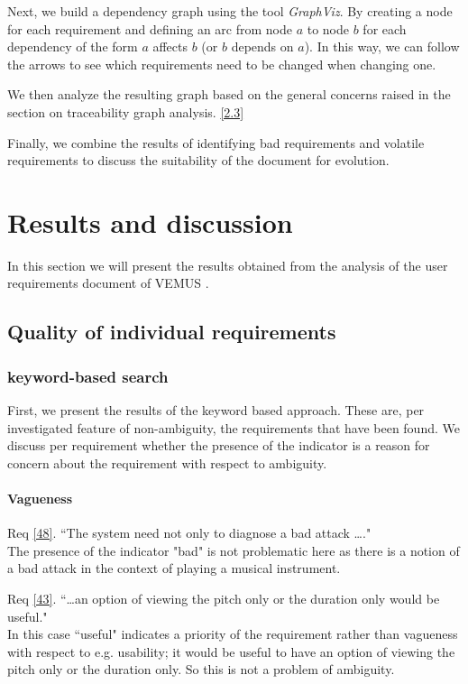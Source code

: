 \documentclass[a4paper,twoside, twocolumn,11pt]{article}
\numberwithin{equation}{section}
\begin{document}
Next, we build a dependency graph using the tool \textit{GraphViz}. By creating a node for each requirement and defining an arc from node $a$ to node $b$ for each dependency of the form $a$ affects $b$ (or $b$ depends on $a$). In this way, we can follow the arrows to see which requirements need to be changed when changing one. 

We then analyze the resulting graph based on the general concerns raised in the section on traceability graph analysis. \ref{2.3}

Finally, we combine the results of identifying bad requirements and volatile requirements to discuss the suitability of the document for evolution. 


\section{Results and discussion}
In this section we will present the results obtained from the analysis of the user requirements document of VEMUS \cite{VEMUS}.

\subsection{Quality of individual requirements}
\subsubsection{keyword-based search}
First, we present the results of the keyword based approach. These are, per investigated feature of non-ambiguity, the requirements that have been found. We discuss per requirement whether the presence of the indicator is a reason for concern about the requirement with respect to ambiguity.
\paragraph{Vagueness} 
Req \ref{48}. ``The system need not only to diagnose a bad attack \ldots." \\
The presence of the indicator "bad" is not problematic here as there is a notion of a bad attack in the context of playing a musical instrument.

Req \ref{43}. ``\ldots an option of viewing the pitch only or the duration only would be useful."\\  In this case ``useful" indicates a priority of the requirement rather than vagueness with respect to e.g. usability; it would be useful to have an option of viewing the pitch only or the duration only. So this is not a problem of ambiguity.
\end{document}
